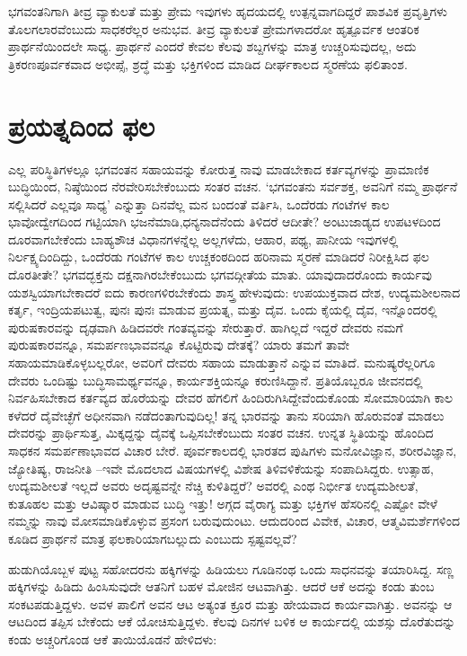 ಭಗವಂತನಿಗಾಗಿ ತೀವ್ರ ವ್ಯಾಕುಲತೆ ಮತ್ತು ಪ್ರೇಮ ಇವುಗಳು ಹೃದಯದಲ್ಲಿ ಉತ್ಪನ್ನವಾಗದಿದ್ದರೆ ಪಾಶವಿಕ ಪ್ರವೃತ್ತಿಗಳು ತೊಲಗಲಾರವೆಂಬುದು ಸಾಧಕರೆಲ್ಲರ ಅನುಭವ. ತೀವ್ರ ವ್ಯಾಕುಲತೆ ಪ್ರೇಮಗಳಾದರೋ ಹೃತ್ಪೂರ್ವಕ ಆಂತರಿಕ ಪ್ರಾರ್ಥನೆಯಿಂದಲೇ ಸಾಧ್ಯ. ಪ್ರಾರ್ಥನೆ ಎಂದರೆ ಕೇವಲ ಕೆಲವು ಶಬ್ದಗಳನ್ನು ಮಾತ್ರ ಉಚ್ಚರಿಸುವುದಲ್ಲ, ಅದು ತ್ರಿಕರಣಪೂರ್ವಕವಾದ ಅಭೀಪ್ಸೆ, ಶ್ರದ್ಧೆ ಮತ್ತು ಭಕ್ತಿಗಳಿಂದ ಮಾಡಿದ ದೀರ್ಘಕಾಲದ ಸ್ಮರಣೆಯ ಫಲಿತಾಂಶ.


\section*{ಪ್ರಯತ್ನದಿಂದ ಫಲ}


ಎಲ್ಲ ಪರಿಸ್ಥಿತಿಗಳಲ್ಲೂ ಭಗವಂತನ ಸಹಾಯವನ್ನು ಕೋರುತ್ತ ನಾವು ಮಾಡಬೇಕಾದ ಕರ್ತವ್ಯಗಳನ್ನು ಪ್ರಾಮಾಣಿಕ ಬುದ್ಧಿಯಿಂದ, ನಿಷ್ಠೆಯಿಂದ ನೆರವೇರಿಸಬೇಕೆಂಬುದು ಸಂತರ ವಚನ. ‘ಭಗವಂತನು ಸರ್ವಶಕ್ತ, ಅವನಿಗೆ ನಮ್ಮ ಪ್ರಾರ್ಥನೆ ಸಲ್ಲಿಸಿದರೆ ಎಲ್ಲವೂ ಸಾಧ್ಯ’ ಎನ್ನುತ್ತಾ ದಿನವೆಲ್ಲ ಮನ ಬಂದಂತೆ ವರ್ತಿಸಿ, ಒಂದೆರಡು ಗಂಟೆಗಳ ಕಾಲ ಭಾವೋದ್ವೇಗದಿಂದ ಗಟ್ಟಿಯಾಗಿ ಭಜನೆಮಾಡಿ,ಧನ್ಯನಾದೆನೆಂದು ತಿಳಿದರೆ ಆದೀತೇ? ಅಂಟುಜಾಡ್ಯದ ಉಪಟಳದಿಂದ ದೂರವಾಗಬೇಕೆಂದು ಬಾಹ್ಯಶೌಚ ವಿಧಾನಗಳನ್ನೆಲ್ಲ ಅಲ್ಲಗಳೆದು, ಆಹಾರ, ಪಥ್ಯ, ಪಾನೀಯ ಇವುಗಳಲ್ಲಿ ನಿರ್ಲಕ್ಷ್ಯದಿಂದಿದ್ದು, ಒಂದೆರಡು ಗಂಟೆಗಳ ಕಾಲ ಉಚ್ಚಕಂಠದಿಂದ ಹರಿನಾಮ ಸ್ಮರಣೆ ಮಾಡಿದರೆ ನಿರೀಕ್ಷಿಸಿದ ಫಲ ದೊರತೀತೇ? ಭಗವದ್ಭಕ್ತನು ದಕ್ಷನಾಗಿರಬೇಕೆಂಬುದು ಭಗವದ್ಗೀತೆಯ ಮಾತು. ಯಾವುದಾದರೊಂದು ಕಾರ್ಯವು ಯಶಸ್ವಿಯಾಗಬೇಕಾದರೆ ಐದು ಕಾರಣ\-ಗಳಿರ\-ಬೇಕೆಂದು ಶಾಸ್ತ್ರ ಹೇಳುವುದು: ಉಪಯುಕ್ತವಾದ ದೇಶ, ಉದ್ಯಮಶೀಲನಾದ ಕರ್ತೃ, ಇಂದ್ರಿಯ\-ಪಟುತ್ವ, ಪುನಃ ಪುನಃ ಮಾಡುವ ಪ್ರಯತ್ನ, ಮತ್ತು ದೈವ. ಒಂದು ಕೈಯಲ್ಲಿ ದೈವ, ಇನ್ನೊಂದರಲ್ಲಿ ಪುರುಷಕಾರವನ್ನು ದೃಢವಾಗಿ ಹಿಡಿದವರೇ ಗಂತವ್ಯವನ್ನು ಸೇರುತ್ತಾರೆ. ಹಾಗಿಲ್ಲದೆ ಇದ್ದರೆ ದೇವರು ನಮಗೆ ಪುರುಷಕಾರವನ್ನೂ, ಸಮರ್ಪಣಭಾವವನ್ನೂ ಕೊಟ್ಟಿರುವು ದೇತಕ್ಕೆ? ಯಾರು ತಮಗೆ ತಾವೇ ಸಹಾಯಮಾಡಿಕೊಳ್ಳಬಲ್ಲರೋ, ಅವರಿಗೆ ದೇವರು ಸಹಾಯ ಮಾಡುತ್ತಾನೆ ಎನ್ನುವ ಮಾತಿದೆ. ಮನುಷ್ಯರೆಲ್ಲರಿಗೂ ದೇವರು ಒಂದಿಷ್ಟು ಬುದ್ಧಿಸಾಮರ್ಥ್ಯವನ್ನೂ, ಕಾರ್ಯಶಕ್ತಿಯನ್ನೂ ಕರುಣಿಸಿದ್ದಾನೆ. ಪ್ರತಿಯೊಬ್ಬರೂ ಜೀವನದಲ್ಲಿ ನಿರ್ವಹಿಸಬೇಕಾದ ಕರ್ತವ್ಯದ ಹೊರೆಯನ್ನು ದೇವರ ಹೆಗಲಿಗೆ ಹಿಂದಿರುಗಿಸಿದ್ದೇವೆಂದುಕೊಂಡು ಸೋಮಾರಿಯಾಗಿ ಕಾಲ ಕಳೆದರೆ ದೈವೇಚ್ಛೆಗೆ ಅಧೀನವಾಗಿ ನಡೆದಂತಾಗುವುದಿಲ್ಲ! ತನ್ನ ಭಾರವನ್ನು ತಾನು ಸರಿಯಾಗಿ ಹೊರುವಂತೆ ಮಾಡಲು ದೇವರನ್ನು ಪ್ರಾರ್ಥಿಸುತ್ತ, ಮಿಕ್ಕದ್ದನ್ನು ದೈವಕ್ಕೆ ಒಪ್ಪಿಸಬೇಕೆಂಬುದು ಸಂತರ ವಚನ. ಉನ್ನತ ಸ್ಥಿತಿಯನ್ನು ಹೊಂದಿದ ಸಾಧಕನ ಸಮರ್ಪಣಾಭಾವದ ವಿಚಾರ ಬೇರೆ. ಪೂರ್ವಕಾಲದಲ್ಲಿ ಭಾರತದ ಪುಷಿಗಳು ಮನೋವಿಜ್ಞಾನ, ಶರೀರವಿಜ್ಞಾನ, ಜ್ಯೋತಿಷ್ಯ, ರಾಜನೀತಿ –ಇವೇ ಮೊದಲಾದ ವಿಷಯಗಳಲ್ಲಿ ವಿಶೇಷ ತಿಳಿವಳಿಕೆಯನ್ನು ಸಂಪಾದಿಸಿದ್ದರು. ಉತ್ಸಾಹ, ಉದ್ಯಮಶೀಲತೆ ಇಲ್ಲದೆ ಅವರು ಅದೃಷ್ಟವನ್ನೇ ನೆಚ್ಚಿ ಕುಳಿತಿದ್ದರೆ? ಅವರಲ್ಲಿ ಎಂಥ ನಿರ್ಭೀತ ಉದ್ಯಮಶೀಲತೆ, ಕುತೂಹಲ ಮತ್ತು ಆವಿಷ್ಕಾರ ಮಾಡುವ ಬುದ್ಧಿ ಇತ್ತು! ಅಗ್ಗದ ವೈರಾಗ್ಯ ಮತ್ತು ಭಕ್ತಿಗಳ ಹೆಸರಿನಲ್ಲಿ ಎಷ್ಟೋ ವೇಳೆ ನಮ್ಮನ್ನು ನಾವು ಮೋಸಮಾಡಿಕೊಳ್ಳುವ ಪ್ರಸಂಗ ಬರುವುದುಂಟು. ಆದುದರಿಂದ ವಿವೇಕ, ವಿಚಾರ, ಆತ್ಮವಿಮರ್ಶೆಗಳಿಂದ ಕೂಡಿದ ಪ್ರಾರ್ಥನೆ ಮಾತ್ರ ಫಲಕಾರಿಯಾಗಬಲ್ಲುದು ಎಂಬುದು ಸ್ಪಷ್ಟವಲ್ಲವೆ?

ಹುಡುಗಿಯೊಬ್ಬಳ ಪುಟ್ಟ ಸಹೋದರನು ಹಕ್ಕಿಗಳನ್ನು ಹಿಡಿಯಲು ಗೂಡಿನಂಥ ಒಂದು ಸಾಧನವನ್ನು ತಯಾರಿಸಿದ್ದ. ಸಣ್ಣ ಹಕ್ಕಿಗಳನ್ನು ಹಿಡಿದು ಹಿಂಸಿಸುವುದೇ ಆತನಿಗೆ ಬಹಳ ಮೋಜಿನ ಆಟವಾಗಿತ್ತು. ಆದರೆ ಆಕೆ ಅದನ್ನು ಕಂಡು ತುಂಬ ಸಂಕಟಪಡುತ್ತಿದ್ದಳು. ಅವಳ ಪಾಲಿಗೆ ಅವನ ಆಟ ಅತ್ಯಂತ ಕ್ರೂರ ಮತ್ತು ಹೇಯವಾದ ಕಾರ್ಯವಾಗಿತ್ತು. ಅವನನ್ನು ಆ ಆಟದಿಂದ ತಪ್ಪಿಸ ಬೇಕೆಂದು ಆಕೆ ಯೋಚಿಸುತ್ತಿದ್ದಳು. ಕೆಲವು ದಿನಗಳ ಬಳಿಕ ಆ ಕಾರ್ಯದಲ್ಲಿ ಯಶಸ್ಸು ದೊರೆತುದನ್ನು ಕಂಡು ಅಚ್ಚರಿಗೊಂಡ ಆಕೆ ತಾಯಿಯೊಡನೆ ಹೇಳಿದಳು:

